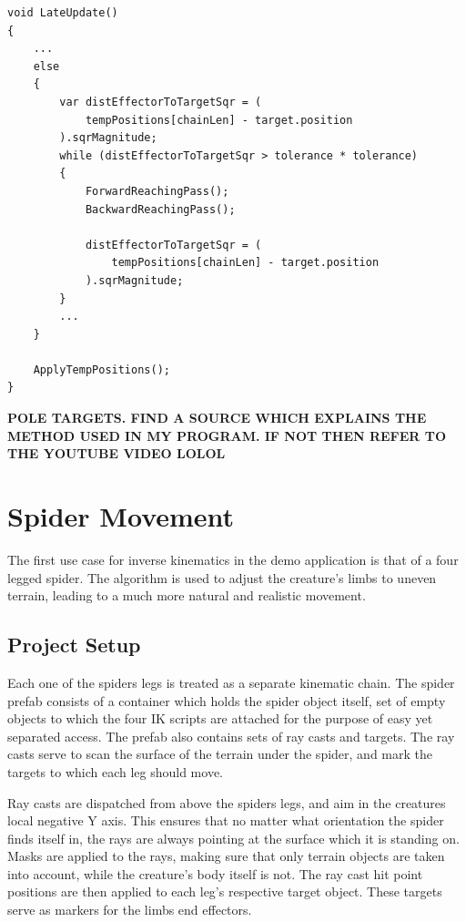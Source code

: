 \begin{lstlisting}[basicstyle=\footnotesize, numbers=none,frame=single,
caption={FABRIK Loop},captionpos=b, label=loop, language={[Sharp]c}]
void LateUpdate()
{
    ...
    else
    {
        var distEffectorToTargetSqr = (
            tempPositions[chainLen] - target.position
        ).sqrMagnitude;
        while (distEffectorToTargetSqr > tolerance * tolerance)
        {
            ForwardReachingPass();
            BackwardReachingPass();

            distEffectorToTargetSqr = (
                tempPositions[chainLen] - target.position
            ).sqrMagnitude;
        }
        ...
    }

    ApplyTempPositions();
}
\end{lstlisting}

\textbf{POLE TARGETS. FIND A SOURCE WHICH EXPLAINS THE METHOD USED IN MY
PROGRAM. IF NOT THEN REFER TO THE YOUTUBE VIDEO LOLOL}


\section{Spider Movement}
The first use case for inverse kinematics in the demo application is that of
a four legged spider. The algorithm is used to adjust the creature's limbs to
uneven terrain, leading to a much more natural and realistic movement.
\subsection{Project Setup}
Each one of the spiders legs is treated as a separate kinematic chain. The
spider prefab consists of a container which holds the spider object itself, set
of empty objects to which the four IK scripts are attached for the purpose of
easy yet separated access. The prefab also contains sets of ray casts and
targets. The ray casts serve to scan the surface of the terrain under the
spider, and mark the targets to which each leg should move.

Ray casts are dispatched from above the spiders legs, and aim in the creatures
local negative Y axis. This ensures that no matter what orientation the spider
finds itself in, the rays are always pointing at the surface which it is
standing on. Masks are applied to the rays, making sure that only terrain
objects are taken into account, while the creature's body itself is not. The ray
cast hit point positions are then applied to each leg's respective target
object. These targets serve as markers for the limbs end effectors. 

